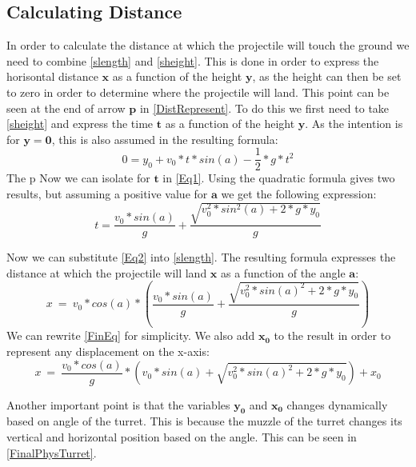 \subsection{Calculating Distance}\label{CalcDist}
In order to calculate the distance at which the projectile will touch the ground
we need to combine \autoref{slength} and \autoref{sheight}. This is done in
order to express the horisontal distance $\mathbf{x}$ as a function of the
height $\mathbf{y}$, as the height can then be set to zero in order to determine
where the projectile will land. This point can be seen at the end of
arrow $\mathbf{p}$ in \autoref{DistRepresent}. To do this we first need to take
\autoref{sheight} and express the time $\mathbf{t}$ as a function of the height
$\mathbf{y}$. As the intention is for $\mathbf{y=0}$, this is also assumed in
the resulting formula:
\begin{equation}\label{Eq1}
0=y_0+v_0*t*sin(a)-\frac{1}{2}*g*t^2
\end{equation}
The p
Now we can isolate for $\mathbf{t}$ in \autoref{Eq1}. Using the quadratic
formula gives two results, but assuming a positive value for $\mathbf{a}$ we get
the following expression:
\begin{equation}\label{Eq2}
t=\frac{v_0*sin(a)}{g}+\frac{\sqrt{v_0^2*sin^2(a)+2*g*y_0}}{g}
\end{equation}

Now we can substitute \autoref{Eq2} into \autoref{slength}. The resulting
formula expresses the distance at which the projectile will land $\mathbf{x}$ as
a function of the angle $\mathbf{a}$:
\begin{equation}\label{FinEq}
x\ =\ v_0*cos(a)* \left(\frac{v_0*sin(a)}{g} + \frac{
\sqrt{v_0^2*sin(a)^2+2*g*y_0}}{g}\right)
\end{equation}
We can rewrite \autoref{FinEq} for simplicity. We also add $\mathbf{x_0}$ to
the result in order to represent any displacement on the x-axis:
\begin{equation}\label{FinEq2}
x\ =\ \frac{v_0*cos(a)}{g}* \left(
v_0*sin(a)+\sqrt{v_0^2*sin(a)^2+2*g*y_0}\right)+x_0
\end{equation}

Another important point is that the variables $\mathbf{y_0}$ and $\mathbf{x_0}$
changes dynamically based on angle of the turret. This is because the muzzle of
the turret changes its vertical and horizontal position based on the angle. This
can be seen in \autoref{FinalPhysTurret}.

